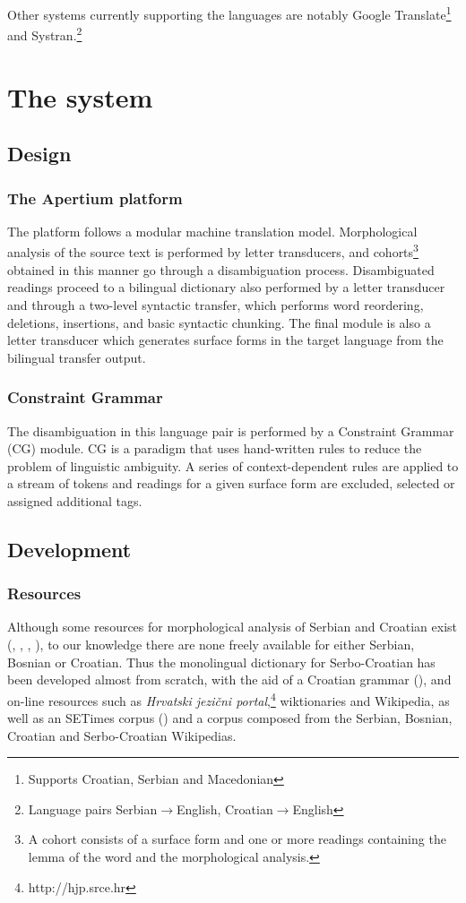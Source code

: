 \documentclass{book}
\begin{document}
Other systems currently supporting the languages are notably Google Translate\footnote{Supports Croatian, Serbian and Macedonian} and Systran.\footnote{Language pairs Serbian$\rightarrow$English, Croatian$\rightarrow$English}

\mainmatter

\chapter{The system}
\section{Design}
\subsection* {The Apertium platform}
\nocite{forcada2011apertium}
The platform follows a modular machine translation model.
Morphological analysis of the source text is performed by
letter transducers, and cohorts\footnote{A cohort consists of a surface form and one or more readings containing the lemma of the word and the morphological analysis.} obtained in this manner go through
a disambiguation process. 
Disambiguated readings proceed to a bilingual dictionary also performed 
by a letter transducer and  through a two-level syntactic transfer, which performs word reordering, deletions, insertions, and basic syntactic chunking.
The final module is also a letter transducer which generates surface forms 
in the target language from the bilingual transfer output.

\subsection* {Constraint Grammar}
The 
disambiguation in this language pair is performed by a
Constraint Grammar (CG) module. CG is a 
paradigm that uses hand-written rules to reduce the problem 
of linguistic ambiguity. A series of context-dependent rules are applied 
to a stream of tokens and readings for a given surface form are excluded, 
selected or assigned additional tags.

\section{Development}
\subsection*{Resources}
Although some resources for morphological analysis of Serbian and Croatian exist
(\citealp{vitas2004intex}, \citealp{vitas2003processing}, \citealp{agic2008improving}, \citealp{snajder08automatic}), 
to our knowledge there are none freely available for either Serbian, Bosnian or 
Croatian. Thus the monolingual dictionary for Serbo-Croatian has been developed 
almost from scratch, with the aid of a Croatian grammar (\citealp{baric1997hrvatska}), 
and on-line resources such as \emph{Hrvatski jezični portal},\footnote{http://hjp.srce.hr}
wiktionaries and Wikipedia, as well as an SETimes corpus (\citealp{tyers2010south}) and a 
corpus composed from the Serbian, Bosnian, Croatian and Serbo-Croatian Wikipedias.
\end{document}
